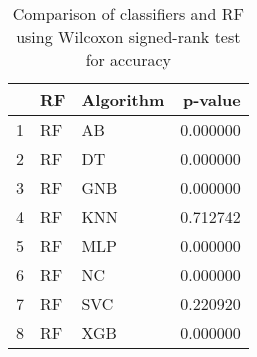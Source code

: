 \begin{table}
\footnotesize
\caption{Comparison of classifiers and RF using Wilcoxon signed-rank test for accuracy}
\label{tab:RF wilcoxon ACC comparison}
\begin{tabular}{lllr}
\hline
 & RF & Algorithm & p-value \\
\hline
1 & RF & AB & 0.000000 \\
2 & RF & DT & 0.000000 \\
3 & RF & GNB & 0.000000 \\
4 & RF & KNN & 0.712742 \\
5 & RF & MLP & 0.000000 \\
6 & RF & NC & 0.000000 \\
7 & RF & SVC & 0.220920 \\
8 & RF & XGB & 0.000000 \\
\hline
\end{tabular}
\end{table}
